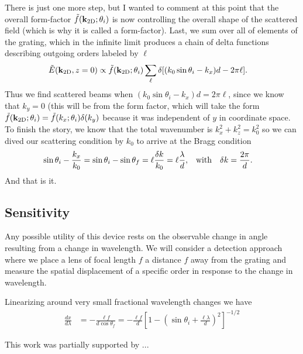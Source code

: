 \documentclass[letterpaper,preprint,aps,pra,superscriptaddress]{revtex4-1}
\begin{document}
There is just one more step, but I wanted to comment at this point that the overall form-factor $\tilde f({\bf k}_{\rm 2D};\theta_i)$ is now controlling the overall shape of the scattered field (which is why it is called a form-factor).  Last, we sum over all of elements of the grating, which in the infinite limit produces a chain of delta functions describing outgoing orders labeled by $\ell$
\begin{align}
\tilde E({\bf k}_{\rm 2D},z=0) &\propto \tilde f({\bf k}_{\rm 2D};\theta_i) \sum_\ell \delta[(k_0 \sin\theta_i - k_x) d - 2\pi\ell].
\end{align}
Thus we find scattered beams when $(k_0 \sin\theta_i - k_x) d = 2\pi\ell$, since we know that $k_y=0$ (this will be from the form factor, which will take the form $\tilde f({\bf k}_{\rm 2D};\theta_i) = \tilde f(k_x;\theta_i) \delta(k_y)$ because it was independent of $y$ in coordinate space.  To finish the story, we know that the total wavenumber is $k_x^2 + k_z^2 = k_0^2$ so we can dived our scattering condition by $k_0$ to arrive at the Bragg condition
\begin{align}
\sin\theta_i - \frac{k_x}{k_0} =\sin\theta_i - \sin\theta_f &= \ell \frac{\delta k}{k_0} = \ell\frac{\lambda}{d}, & {\rm with} && \delta k &= \frac{2\pi}{d}.
\end{align}
And that is it.

\subsection{Sensitivity}

Any possible utility of this device rests on the observable change in angle resulting from a change in wavelength.  We will consider a detection approach where we place a lens of focal length $f$ a distance $f$ away from the grating and measure the spatial displacement of a specific order in response to the change in wavelength. 

Linearizing around very small fractional wavelength changes we have
\begin{align}
\frac{d x}{d \lambda} &= -\frac{\ell f}{d\cos\theta_f} = -\frac{\ell f}{d}\left[1-\left(\sin\theta_i+\frac{\ell \lambda}{d}\right)^2\right]^{-1/2}
\end{align}


\begin{acknowledgments}
This work was partially supported by ...
\end{acknowledgments}


% 
\end{document}
